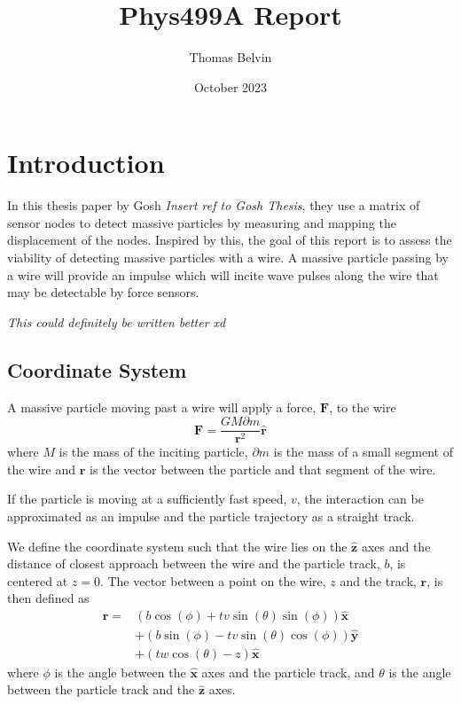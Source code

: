 \documentclass{report}
\title{Phys499A Report}
\author{Thomas Belvin}
\date{October 2023}
\begin{document}
\maketitle
\chapter*{Introduction}
In this thesis paper by Gosh \emph{Insert ref to Gosh Thesis}, they use a matrix of sensor nodes to detect massive particles by measuring and mapping the displacement of the nodes.
Inspired by this, the goal of this report is to assess the viability of detecting massive particles with a wire.
A massive particle passing by a wire will provide an impulse which will incite wave pulses along the wire that may be detectable by force sensors. 

\emph{This could definitely be written better xd}
\section*{Coordinate System}
A massive particle moving past a wire will apply a force, $\mathbf{F}$, to the wire 
\begin{equation}
    \mathbf{F} = \frac{G M \partial m}{\mathbf{r}^2} \mathbf{\hat r}
    \label{eqn:force}
\end{equation}
where $M$ is the mass of the inciting particle, $\partial m$ is the mass of a small segment of the wire and $\mathbf{r}$ is the vector between the particle and that segment of the wire.

If the particle is moving at a sufficiently fast speed, $v$, the  interaction can be approximated as an impulse and the particle trajectory as a straight track.

We define the coordinate system such that the wire lies on the $\mathbf{\hat z}$ axes and the distance of closest approach between the wire and the particle track, $b$, is centered at $z = 0$.
The vector between a point on the wire, $z$ and the track, $\mathbf{r}$, is then defined as
\begin{align}
    \nonumber \mathbf{r}=& (b \cos (\phi )+t v \sin (\theta ) \sin (\phi )) \mathbf{\hat x} \\
               \nonumber & +(b \sin (\phi )-t v \sin (\theta ) \cos (\phi )) \mathbf{\hat y}\\
                         & + (t w \cos (\theta )-z) \mathbf{\hat x}
    \label{eqn:r}
\end{align}
where $\phi$ is the angle between the $\mathbf{\hat x}$ axes and the particle track, and $\theta$ is the angle between the particle track and the $\mathbf{\hat z}$ axes.
\end{document}
